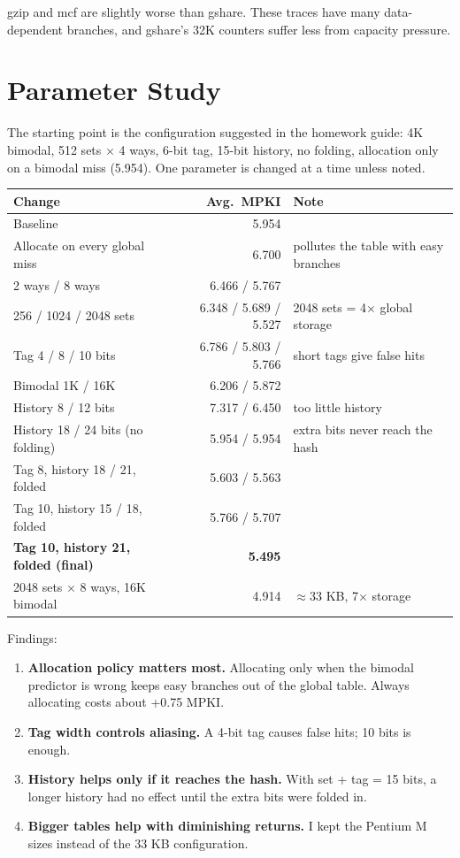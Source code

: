 \documentclass[11pt]{article}
\begin{document}
gzip and mcf are slightly worse than gshare. These traces have many
data-dependent branches, and gshare's 32K counters suffer less from capacity
pressure.

\section{Parameter Study}

The starting point is the configuration suggested in the homework guide: 4K
bimodal, 512 sets $\times$ 4 ways, 6-bit tag, 15-bit history, no folding,
allocation only on a bimodal miss (5.954). One parameter is changed at a time
unless noted.

\begin{table}[H]
\centering
\small
\begin{tabular}{lrl}
\toprule
Change & Avg.\ MPKI & Note \\
\midrule
Baseline & 5.954 & \\
Allocate on every global miss & 6.700 & pollutes the table with easy branches \\
2 ways / 8 ways & 6.466 / 5.767 & \\
256 / 1024 / 2048 sets & 6.348 / 5.689 / 5.527 & 2048 sets = 4$\times$ global storage \\
Tag 4 / 8 / 10 bits & 6.786 / 5.803 / 5.766 & short tags give false hits \\
Bimodal 1K / 16K & 6.206 / 5.872 & \\
History 8 / 12 bits & 7.317 / 6.450 & too little history \\
History 18 / 24 bits (no folding) & 5.954 / 5.954 & extra bits never reach the hash \\
Tag 8, history 18 / 21, folded & 5.603 / 5.563 & \\
Tag 10, history 15 / 18, folded & 5.766 / 5.707 & \\
\textbf{Tag 10, history 21, folded (final)} & \textbf{5.495} & \\
2048 sets $\times$ 8 ways, 16K bimodal & 4.914 & $\approx$33 KB, 7$\times$ storage \\
\bottomrule
\end{tabular}
\end{table}

\noindent Findings:
\begin{enumerate}
\item \textbf{Allocation policy matters most.} Allocating only when the bimodal
      predictor is wrong keeps easy branches out of the global table. Always
      allocating costs about +0.75 MPKI.
\item \textbf{Tag width controls aliasing.} A 4-bit tag causes false hits;
      10 bits is enough.
\item \textbf{History helps only if it reaches the hash.} With set + tag = 15
      bits, a longer history had no effect until the extra bits were folded in.
\item \textbf{Bigger tables help with diminishing returns.} I kept the Pentium M
      sizes instead of the 33 KB configuration.
\end{enumerate}
\end{document}
